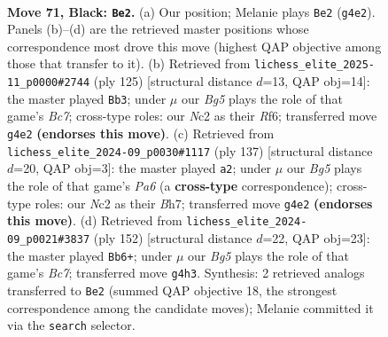 \documentclass[11pt]{article}
\begin{document}
\clearpage

\begin{figure}[p]\centering
\begin{subfigure}{0.46\textwidth}\centering
\resizebox{\linewidth}{!}{%
\newchessgame
\chessboard[
  setfen={8/7k/5B2/8/r5b1/6R1/2n2P1K/8 b - - 3 71},
  showmover=false,
  pgfstyle=straightmove, color=movearrow, markmove={g4-e2}
]}
\caption{}
\end{subfigure}\hfill
\begin{subfigure}{0.46\textwidth}\centering
\resizebox{\linewidth}{!}{%
\newchessgame
\chessboard[
  setfen={8/8/5r2/2R5/1P1K4/8/1kb5/8 b - - 6 63},
  showmover=false,
  pgfstyle=straightmove, color=movearrow, markmove={c2-b3}
]}
\caption{}
\end{subfigure}
\\[4pt]
\begin{subfigure}{0.46\textwidth}\centering
\resizebox{\linewidth}{!}{%
\newchessgame
\chessboard[
  setfen={8/7b/3k3P/8/3K4/p3R3/8/8 b - - 2 69},
  showmover=false,
  pgfstyle=straightmove, color=movearrow, markmove={a3-a2}
]}
\caption{}
\end{subfigure}\hfill
\begin{subfigure}{0.46\textwidth}\centering
\resizebox{\linewidth}{!}{%
\newchessgame
\chessboard[
  setfen={2r5/1kB1R3/8/1K6/8/8/8/8 w - - 6 77},
  showmover=false,
  pgfstyle=straightmove, color=movearrow, markmove={c7-b6}
]}
\caption{}
\end{subfigure}
\caption{\textbf{Move 71, Black: \texttt{Be2}.} (a) Our position; Melanie plays \texttt{Be2} (\texttt{g4e2}). Panels (b)--(d) are the retrieved master positions whose correspondence most drove this move (highest QAP objective among those that transfer to it). (b) Retrieved from \texttt{lichess\_elite\_2025-11\_p0000\#2744} (ply 125) [structural distance $d$=13, QAP obj=14]: the master played \texttt{Bb3}; under $\mu$ our \emph{Bg5} plays the role of that game's \emph{Bc7}; cross-type roles: our \emph{N}c2 as their \emph{R}f6; transferred move \texttt{g4e2} \textbf{(endorses this move)}. (c) Retrieved from \texttt{lichess\_elite\_2024-09\_p0030\#1117} (ply 137) [structural distance $d$=20, QAP obj=3]: the master played \texttt{a2}; under $\mu$ our \emph{Bg5} plays the role of that game's \emph{Pa6} (a \textbf{cross-type} correspondence); cross-type roles: our \emph{N}c2 as their \emph{B}h7; transferred move \texttt{g4e2} \textbf{(endorses this move)}. (d) Retrieved from \texttt{lichess\_elite\_2024-09\_p0021\#3837} (ply 152) [structural distance $d$=22, QAP obj=23]: the master played \texttt{Bb6+}; under $\mu$ our \emph{Bg5} plays the role of that game's \emph{Bc7}; transferred move \texttt{g4h3}. Synthesis: 2 retrieved analogs transferred to \texttt{Be2} (summed QAP objective 18, the strongest correspondence among the candidate moves); Melanie committed it via the \texttt{search} selector.}
\label{fig:thought-m141}
\end{figure}
\end{document}
